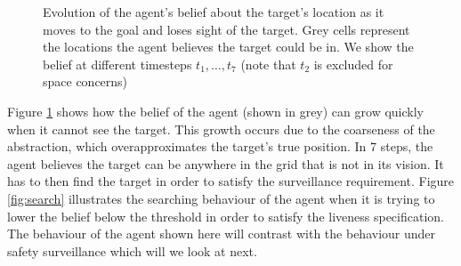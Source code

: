 \begin{figure}
\begin{minipage}{5.0cm}
\end{minipage}

	
	\caption{Evolution of the agent's belief about the target's location as it moves to the goal and loses sight of the target. Grey cells represent the locations the agent believes the target could be in. We show the belief at different timesteps $t_1,\ldots,t_7$ (note that $t_2$ is excluded for space concerns)
		}
	\label{fig:case1exp}
	
\end{figure}

Figure \ref{fig:case1exp} shows how the belief of the agent (shown in grey) can grow quickly when it cannot see the target. This growth occurs due to the coarseness of the abstraction, which overapproximates the target's true position. In 7 steps, the agent believes the target can be anywhere in the grid that is not in its vision. It has to then find the target in order to satisfy the surveillance requirement. Figure \ref{fig:search} illustrates the searching behaviour of the agent when it is trying to lower the belief below the threshold in order to satisfy the liveness specification. The behaviour of the agent shown here will contrast with the behaviour under safety surveillance which will we look at next.

